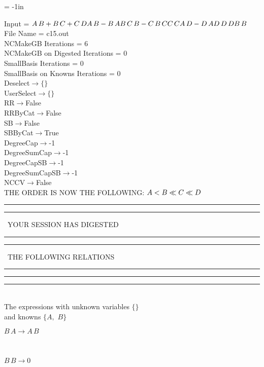 \voffset = -1in
\evensidemargin 0.1in
\oddsidemargin 0.1in
\textheight 9in
\textwidth 6in

\normalsize
\baselineskip=12pt
\noindent
Input = 
$
\\A\,
 B + B\,
 C + C\,
 D\\
A\,
 B - B\,
 A\\
B\,
 C\,
 B - C\,
 B\,
 C\\
C\,
 C\\
A\,
 D - D\,
 A\\
D\,
 D\,
 D\\
B\,
 B\\
$
File Name = c15.out\\
NCMakeGB Iterations = 6\\
NCMakeGB on Digested Iterations = 0\\
SmallBasis Iterations = 0\\
SmallBasis on Knowns Iterations = 0\\
Deselect$\rightarrow \{\}$\\
UserSelect$\rightarrow \{\}$\\
RR$\rightarrow $False\\
RRByCat$\rightarrow $False\\
SB$\rightarrow $False\\
SBByCat$\rightarrow $True\\
DegreeCap$\rightarrow $-1\\
DegreeSumCap$\rightarrow $-1\\
DegreeCapSB$\rightarrow $-1\\
DegreeSumCapSB$\rightarrow $-1\\
NCCV$\rightarrow $False\\
THE ORDER IS NOW THE FOLLOWING:\hfil\break
$
A<B\ll
C\ll
D\\
$
\rule[2pt]{6in}{4pt}\hfil\break
\rule[2pt]{1.879in}{4pt}
\ YOUR SESSION HAS DIGESTED\ 
\rule[2pt]{1.879in}{4pt}\hfil\break
\rule[2pt]{1.923in}{4pt}
\ THE FOLLOWING RELATIONS\ 
\rule[2pt]{1.923in}{4pt}\hfil\break
\rule[2pt]{6in}{4pt}\hfil\break
\rule[3pt]{6in}{.7pt}\\
The expressions with unknown variables $\{\}$\\
and knowns $\{A,
$ $
B\}$\smallskip\\
\begin{minipage}{6in}
$
B\,
 A\rightarrow A\,
 B
$
\end{minipage}\medskip \\
\begin{minipage}{6in}
$
B\,
 B\rightarrow 0
$
\end{minipage}\\
